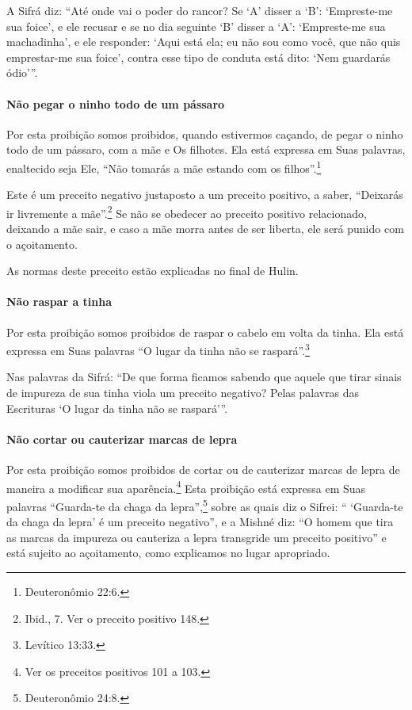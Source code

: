 A Sifrá diz: ``Até onde vai o poder do rancor? Se `A' disser a `B':
`Empreste-me sua foice', e ele recusar e se no dia seguinte `B' disser a
`A': `Empreste-me sua machadinha', e ele responder: `Aqui está ela; eu
não sou como você, que não quis emprestar-me sua foice', contra esse
tipo de conduta está dito: `Nem guardarás ódio'''.

\paragraph{Não pegar o ninho todo de um pássaro}

Por esta proibição somos proibidos, quando estivermos caçando, de pegar
o ninho todo de um pássaro, com a mãe e Os filhotes. Ela está expressa
em Suas palavras, enaltecido seja Ele, ``Não tomarás a mãe estando com
os filhos''.\footnote{Deuteronômio 22:6.}

Este é um preceito negativo justaposto a um preceito positivo, a saber,
``Deixarás ir livremente a mãe''.\footnote{Ibid., 7. Ver o preceito positivo 148.} Se não
se obedecer ao preceito positivo relacionado, deixando a mãe sair, e caso a mãe morra antes de ser liberta, ele será punido com o açoitamento.

As normas deste preceito estão explicadas no final de Hulin.

\paragraph{Não raspar a tinha}

Por esta proibição somos proibidos de raspar o cabelo em volta da tinha.
Ela está expressa em Suas palavras ``O lugar da tinha não se raspará''.\footnote{Levítico 13:33.}

Nas palavras da Sifrá: ``De que forma ficamos sabendo que aquele que
tirar sinais de impureza de sua tinha viola um preceito negativo? Pelas
palavras das Escrituras `O lugar da tinha não se raspará'''.

\paragraph{Não cortar ou cauterizar marcas de lepra}

Por esta proibição somos proibidos de cortar ou de cauterizar marcas de lepra de maneira a modificar sua aparência.\footnote{Ver os preceitos positivos 101 a 103.}
Esta proibição está expressa em Suas palavras ``Guarda-te da chaga da
lepra'',\footnote{Deuteronômio 24:8.} sobre as quais diz o Sifrei: `` `Guarda-te
da chaga da lepra' é um preceito negativo'', e a Mishné diz: ``O homem
que tira as marcas da impureza ou cauteriza a lepra transgride um
preceito positivo'' e está sujeito ao açoitamento, como explicamos no
lugar apropriado.

